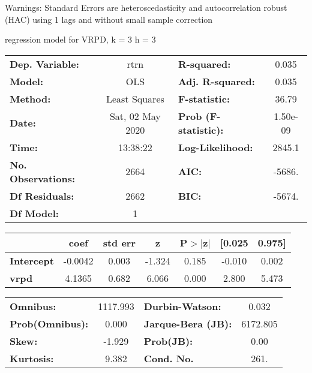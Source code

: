 Warnings: \newline
 [1] Standard Errors are heteroscedasticity and autocorrelation robust (HAC) using 1 lags and without small sample correction\ 

regression model for VRPD, k = 3 h = 3\begin{center}
\begin{tabular}{lclc}
\toprule
\textbf{Dep. Variable:}    &       rtrn       & \textbf{  R-squared:         } &     0.035   \\
\textbf{Model:}            &       OLS        & \textbf{  Adj. R-squared:    } &     0.035   \\
\textbf{Method:}           &  Least Squares   & \textbf{  F-statistic:       } &     36.79   \\
\textbf{Date:}             & Sat, 02 May 2020 & \textbf{  Prob (F-statistic):} &  1.50e-09   \\
\textbf{Time:}             &     13:38:22     & \textbf{  Log-Likelihood:    } &    2845.1   \\
\textbf{No. Observations:} &        2664      & \textbf{  AIC:               } &    -5686.   \\
\textbf{Df Residuals:}     &        2662      & \textbf{  BIC:               } &    -5674.   \\
\textbf{Df Model:}         &           1      & \textbf{                     } &             \\
\bottomrule
\end{tabular}
\begin{tabular}{lcccccc}
                   & \textbf{coef} & \textbf{std err} & \textbf{z} & \textbf{P$> |$z$|$} & \textbf{[0.025} & \textbf{0.975]}  \\
\midrule
\textbf{Intercept} &      -0.0042  &        0.003     &    -1.324  &         0.185        &       -0.010    &        0.002     \\
\textbf{vrpd}      &       4.1365  &        0.682     &     6.066  &         0.000        &        2.800    &        5.473     \\
\bottomrule
\end{tabular}
\begin{tabular}{lclc}
\textbf{Omnibus:}       & 1117.993 & \textbf{  Durbin-Watson:     } &    0.032  \\
\textbf{Prob(Omnibus):} &   0.000  & \textbf{  Jarque-Bera (JB):  } & 6172.805  \\
\textbf{Skew:}          &  -1.929  & \textbf{  Prob(JB):          } &     0.00  \\
\textbf{Kurtosis:}      &   9.382  & \textbf{  Cond. No.          } &     261.  \\
\bottomrule
\end{tabular}
\end{center}

